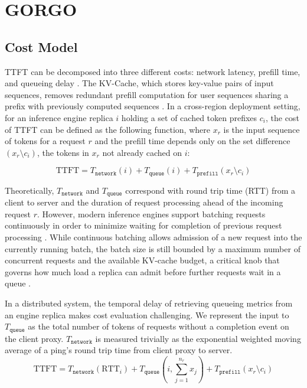 \documentclass{article}
\begin{document}
\section{GORGO}
\label{sec:method}

\subsection{Cost Model}

TTFT can be decomposed into three different costs: network latency, prefill time, and queueing delay \citep{banaserve2025}. The KV-Cache, which stores key-value pairs of input sequences, removes redundant prefill computation for user sequences sharing a prefix with previously computed sequences \citep{sglang2024}. In a cross-region deployment setting, for an inference engine replica $i$ holding a set of cached token prefixes $c_i$, the cost of TTFT can be defined as the following function, where $x_r$ is the input sequence of tokens for a request $r$ and the prefill time depends only on the set difference $(x_r \setminus c_i)$, the tokens in $x_r$ not already cached on $i$:

\begin{equation}
\mathrm{TTFT} = T_{\texttt{network}}(i) + T_{\texttt{queue}}(i) + T_{\texttt{prefill}}(x_r \setminus c_i)
\label{eq:ttft}
\end{equation}

Theoretically, $T_{\texttt{network}}$ and $T_{\texttt{queue}}$ correspond with round trip time (RTT) from a client to server and the duration of request processing ahead of the incoming request $r$. However, modern inference engines support batching requests continuously in order to minimize waiting for completion of previous request processing \citep{orca}. While continuous batching allows admission of a new request into the currently running batch, the batch size is still bounded by a maximum number of concurrent requests and the available KV-cache budget, a critical knob that governs how much load a replica can admit before further requests wait in a queue \citep{vllm2023}.

In a distributed system, the temporal delay of retrieving queueing metrics from an engine replica makes cost evaluation challenging. We represent the input to $T_{\texttt{queue}}$ as the total number of tokens of requests without a completion event on the client proxy. $T_{\texttt{network}}$ is measured trivially as the exponential weighted moving average of a ping's round trip time from client proxy to server.
\begin{equation}
\mathrm{TTFT} = T_{\texttt{network}}(\mathrm{RTT}_i) + T_{\texttt{queue}}\left(i, \sum_{j=1}^{n_r} x_j\right) + T_{\texttt{prefill}}(x_r \setminus c_i)
\end{equation}
\end{document}
